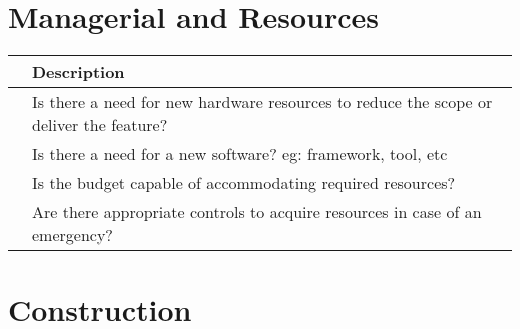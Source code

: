 \documentclass{article}
\begin{document}
\section{Managerial and Resources}

\begin{center}
    \begin{tabular}{ | p{.25cm} || p{10cm} |}
    \hline
     & Description \\ \hline
     & Is there a need for new hardware resources to reduce the scope or deliver the feature? \\ \hline
     & Is there a need for a new software? eg: framework, tool, etc \\ \hline
     & Is the budget capable of accommodating required resources? \\ \hline
     & Are there appropriate controls to acquire resources in case of an emergency? \\ \hline
    \end{tabular}
\end{center}



\section{Construction}
\end{document}
